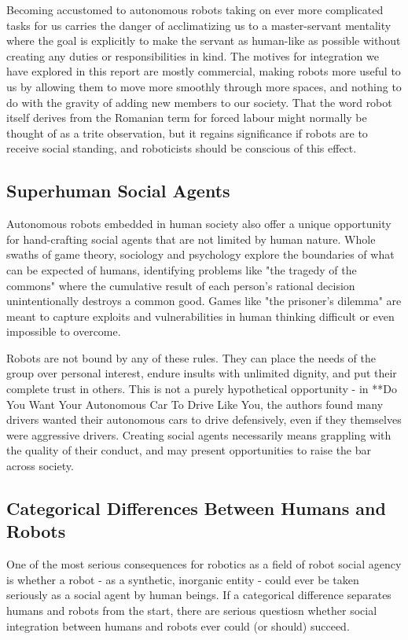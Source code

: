 \documentclass{sfuthesis}
\begin{document}
Becoming accustomed to autonomous robots taking on ever more complicated tasks for us carries the danger of acclimatizing us to a master-servant mentality where the goal is explicitly to make the servant as human-like as possible without creating any duties or responsibilities in kind. The motives for integration we have explored in this report are mostly commercial, making robots more useful to us by allowing them to move more smoothly through more spaces, and nothing to do with the gravity of adding new members to our society. That the word robot itself derives from the Romanian term for forced labour might normally be thought of as a trite observation, but it regains significance if robots are to receive social standing, and roboticists should be conscious of this effect.

\subsection{Superhuman Social Agents}

Autonomous robots embedded in human society also offer a unique opportunity for hand-crafting social agents that are not limited by human nature. Whole swaths of game theory, sociology and psychology explore the boundaries of what can be expected of humans, identifying problems like "the tragedy of the commons" where the cumulative result of each person's rational decision unintentionally destroys a common good. Games like "the prisoner's dilemma" are meant to capture exploits and vulnerabilities in human thinking difficult or even impossible to overcome.

Robots are not bound by any of these rules. They can place the needs of the group over personal interest, endure insults with unlimited dignity, and put their complete trust in others. This is not a purely hypothetical opportunity - in **Do You Want Your Autonomous Car To Drive Like You, the authors found many drivers wanted their autonomous cars to drive defensively, even if they themselves were aggressive drivers. Creating social agents necessarily means grappling with the quality of their conduct, and may present opportunities to raise the bar across society.

\subsection{Categorical Differences Between Humans and Robots}

One of the most serious consequences for robotics as a field of robot social agency is whether a robot - as a synthetic, inorganic entity - could ever be taken seriously as a social agent by human beings. If a categorical difference separates humans and robots from the start, there are serious questiosn whether social integration between humans and robots ever could (or should) succeed.
\end{document}
